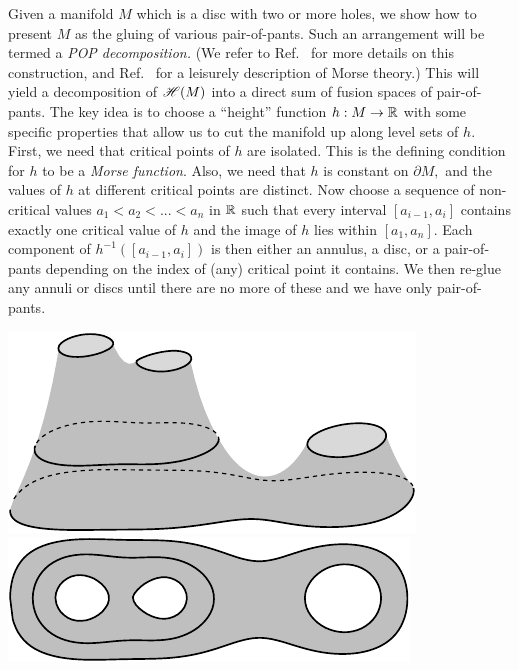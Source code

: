 \documentclass[aps, tightenlines, letterpaper, onecolumn, superscriptaddress, notitlepage, 11pt, groupedaddress]{revtex4-1}
\begin{document}
Given a manifold $M$ which is
a disc with two or more holes, 
we show how to present $M$ as the gluing of various
pair-of-pants. Such an arrangement will be termed a \emph{POP decomposition.}
(We refer to Ref.~\cite{Ivanov2001} for more details on this construction,
and Ref.~\cite{Ghrist2014} for a leisurely description of Morse theory.)
This will yield a decomposition of $\mathscr{H}(M)$ into a direct
sum of fusion spaces of pair-of-pants. %
The key idea is to choose a ``height'' function $h:M\to\mathbb{R}$
with some specific properties that allow us to
cut the manifold up along level sets of $h.$
First, we need that critical points of $h$ are isolated.
This is the defining condition for $h$ to be a \emph{Morse function}.
Also, we need that $h$ is constant on $\partial M,$
and the values of $h$ at different critical points are distinct.
Now choose a sequence of non-critical values $a_1<a_2<...<a_n$ in $\mathbb{R}$
such that every interval $[a_{i-1}, a_i]$ 
contains exactly one critical value of $h$ and the image
of $h$ lies within $[a_1, a_n].$
Each component of $h^{-1}([a_{i-1}, a_i])$ is then either
an annulus, a disc, or a pair-of-pants depending on the index of (any)
critical point it contains.
We then re-glue any annuli or discs until there are no more of these
and we have only pair-of-pants.
\begin{center}
\includegraphics[]{pic-pants.pdf}\ \ \ \ \ \ \ \ \includegraphics[]{pic-pants-1.pdf}
\end{center}
\end{document}
